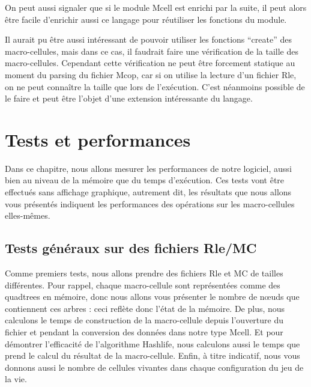 \documentclass[a4paper,12pt]{report}
\begin{document}
\medskip

On peut aussi signaler que si le module Mcell est enrichi par la
suite, il peut alors être facile d'enrichir aussi ce langage pour
réutiliser les fonctions du module.

Il aurait pu être aussi intéressant de pouvoir utiliser les fonctions
``create'' des macro-cellules, mais dans ce cas, il faudrait faire une
vérification de la taille des macro-cellules. Cependant cette
vérification ne peut être forcement statique au moment du parsing du
fichier Mcop, car si on utilise la lecture d'un fichier Rle, on ne
peut connaître la taille que lors de l'exécution. C'est néanmoins
possible de le faire et peut être l'objet d'une extension intéressante
du langage.


\chapter{Tests et performances}

Dans ce chapitre, nous allons mesurer les performances de notre
logiciel, aussi bien au niveau de la mémoire que du temps d'exécution.
Ces tests vont être effectués sans affichage graphique, autrement dit,
les résultats que nous allons vous présentés indiquent les
performances des opérations sur les macro-cellules elles-mêmes.

\section{Tests généraux sur des fichiers Rle/MC}

Comme premiers tests, nous allons prendre des fichiers Rle et MC de
tailles différentes.
Pour rappel, chaque macro-cellule sont représentées comme des
quadtrees en mémoire, donc nous allons vous présenter le nombre de
n\oe uds que contiennent ces arbres : ceci reflète donc l'état de la
mémoire.
De plus, nous calculons le temps de construction de la macro-cellule
depuis l'ouverture du fichier et pendant la conversion des données
dans notre type Mcell.
Et pour démontrer l'efficacité de l'algorithme Hashlife, nous
calculons aussi le temps que prend le calcul du résultat de la
macro-cellule.
Enfin, à titre indicatif, nous vous donnons aussi le nombre de
cellules vivantes dans chaque configuration du jeu de la vie.
\end{document}
